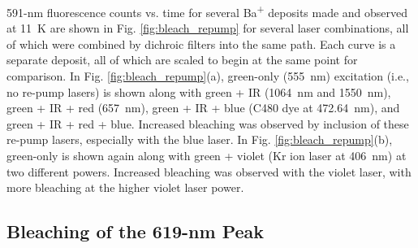 591-nm fluorescence counts vs. time for several Ba\textsuperscript{+} deposits made and observed at 11~K are shown in Fig. \ref{fig:bleach_repump} for several laser combinations, all of which were combined by dichroic filters into the same path.  Each curve is a separate deposit, all of which are scaled to begin at the same point for comparison.  In Fig. \ref{fig:bleach_repump}(a), green-only (555~nm) excitation (i.e., no re-pump lasers) is shown along with green + IR (1064~nm and 1550~nm), green + IR + red (657~nm), green + IR + blue (C480 dye at 472.64~nm), and green + IR + red + blue.  Increased bleaching was observed by inclusion of these re-pump lasers, especially with the blue laser.  In Fig. \ref{fig:bleach_repump}(b), green-only is shown again along with green + violet (Kr ion laser at 406~nm) at two different powers.  Increased bleaching was observed with the violet laser, with more bleaching at the higher violet laser power.




\subsection{Bleaching of the 619-nm Peak}


